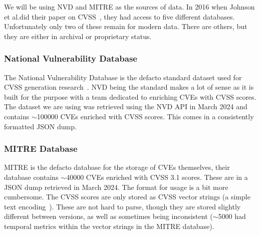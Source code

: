 \documentclass[12pt]{article}
\begin{document}
We will be using NVD and MITRE as the sources of data. In 2016 when Johnson et al.\@ did their paper
on CVSS~\cite{bayes}, they had access to five different databases. Unfortunately only two of these
remain for modern data. There are others, but they are either in archival or proprietary status.

\subsubsection{National Vulnerability Database} \label{NVD_SECTION}

The National Vulnerability Database is the defacto standard dataset used for CVSS generation
research~\cite{costa, nvd_example1, nvd_example2}.  NVD being the standard makes a lot of sense as it is built
for the purpose with a team dedicated to enriching CVEs with CVSS scores. The dataset we are using was
retrieved using the NVD API in March 2024 and contains $\sim$100000 CVEs enriched with CVSS scores. This
comes in a consistently formatted JSON dump.

\subsubsection{MITRE Database}  \label{MITRE_SECTION}

MITRE is the defacto database for the storage of CVEs themselves, their database contains $\sim$40000
CVEs enriched with CVSS 3.1 scores. These are in a JSON dump retrieved in March 2024. The
format for usage is a bit more cumbersome. The CVSS scores are only stored as CVSS vector
strings (a simple text encoding~\cite{vector_string}). These are not hard to parse, though they are stored slightly
different between versions, as well as sometimes being inconsistent ($\sim$5000 had temporal metrics within
the vector strings in the MITRE database).
\end{document}
